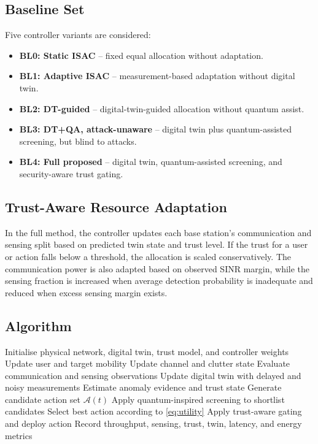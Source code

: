\documentclass[10pt,journal]{IEEEtran}
\begin{document}
\subsection{Baseline Set}
Five controller variants are considered:
\begin{itemize}
    \item \textbf{BL0: Static ISAC} -- fixed equal allocation without adaptation.
    \item \textbf{BL1: Adaptive ISAC} -- measurement-based adaptation without digital twin.
    \item \textbf{BL2: DT-guided} -- digital-twin-guided allocation without quantum assist.
    \item \textbf{BL3: DT+QA, attack-unaware} -- digital twin plus quantum-assisted screening, but blind to attacks.
    \item \textbf{BL4: Full proposed} -- digital twin, quantum-assisted screening, and security-aware trust gating.
\end{itemize}

\subsection{Trust-Aware Resource Adaptation}
In the full method, the controller updates each base station's communication and sensing split based on predicted twin state and trust level. If the trust for a user or action falls below a threshold, the allocation is scaled conservatively. The communication power is also adapted based on observed SINR margin, while the sensing fraction is increased when average detection probability is inadequate and reduced when excess sensing margin exists.

\subsection{Algorithm}
\begin{algorithm}[t]
\caption{Quantum-Assisted Closed-Loop DT-ISAC Control}
\label{alg:qdt}
\begin{algorithmic}[1]
\STATE Initialise physical network, digital twin, trust model, and controller weights
    \STATE Update user and target mobility
    \STATE Update channel and clutter state
    \STATE Evaluate communication and sensing observations
    \STATE Update digital twin with delayed and noisy measurements
    \STATE Estimate anomaly evidence and trust state
    \STATE Generate candidate action set \(\mathcal{A}(t)\)
    \STATE Apply quantum-inspired screening to shortlist candidates
    \STATE Select best action according to \eqref{eq:utility}
    \STATE Apply trust-aware gating and deploy action
    \STATE Record throughput, sensing, trust, twin, latency, and energy metrics
\ENDFOR
\end{algorithmic}
\end{algorithm}
\end{document}
